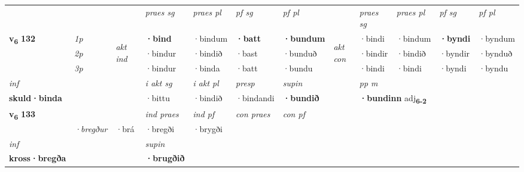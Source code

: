\begin{longtable}[l]{X>{\footnotesize\itshape}llXXXXlXXXX}
 & &   & \textit{praes sg}  & \textit{praes pl}    & \textit{ pf sg} & \textit{pf pl} & & \textit{praes sg}  & \textit{praes pl}    & \textit{pf sg} & \textit{pf pl }  \\ \cmidrule{4-7} \cmidrule{9-12}
 \multirow{2}{*}{{{\textbf{v{\textsubscript{6}}} \Large{\textbf{132}}}}}  & 1p & \multirow{3}{*}{\begin{turn}{90}\textit{akt ind}\end{turn}} & \textbf{·bind} & ·bindum & \textbf{·batt} & \textbf{·bundum} & \multirow{3}{*}{\begin{turn}{90}\textit{akt con}\end{turn}} &·bindi & ·bindum & \textbf{·byndi} & ·byndum\\*
 & 2p &  &  ·bindur  & ·bindið & ·bast & ·bunduð & & ·bindir & ·bindið & ·byndir & ·bynduð \\*
 & 3p &  & ·bindur & ·binda & ·batt & ·bundu & & ·bindi & ·bindi& ·byndi & ·byndu \\*
\cmidrule{4-7} \cmidrule{9-12}

   {\textit{inf}} & &  & \textit{i akt sg} & \textit{i akt pl}   & \textit{presp} & \textit{supin}  && \textit{pp m} \\*
  {\textbf{skuld\allowbreak ·binda}} & && ·bittu  & ·bindið   & ·bindandi &  \textbf{·bundið}  && \multicolumn{2}{l}{\textbf{·bundinn} adj\textbf{\textsubscript{6-2}}} \\*

\midrule

\multirow{2}{*}{{{\textbf{v{\textsubscript{6}}} \Large{\textbf{133}}}}}  &&&  \textit{ind praes} & \textit{ind pf} & \textit{con praes} & \textit{con pf} \\*
\multicolumn{3}{r}{\textit{e-m}} & ·bregður & ·brá & ·bregði & ·brygði \\*

\cmidrule{4-7}
   {\textit{inf}} & &      & \textit{supin}   \\*
  {\textbf{kross\allowbreak ·bregða}} & &      &  \textbf{·brugðið}   \\*

\midrule


\end{longtable}
